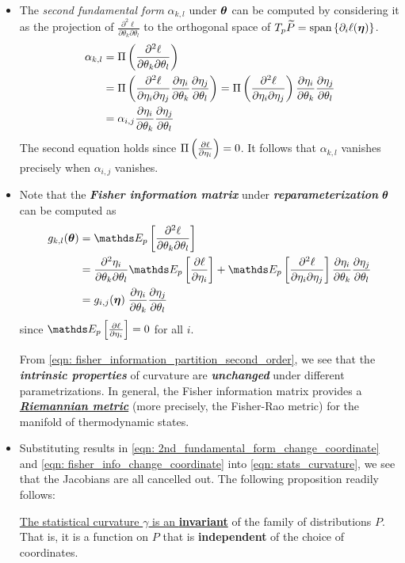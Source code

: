 \documentclass[11pt]{article}
\begin{document}
\begin{itemize}
\item The \emph{second fundamental form} $\alpha_{k,l}$ under  $\boldsymbol{\theta}$ can be computed by considering it as the projection of $\frac{\partial^2\ell}{\partial \theta_k \partial \theta_{l}}$ to the orthogonal space of $T_{p}\widetilde{P} = \text{span}\left\{\partial_i  \ell(\boldsymbol{\eta})\right\}$. 
\begin{align}
\alpha_{k,l} &= \Pi\left(\frac{\partial^2\ell}{\partial \theta_k \partial \theta_{l}} \right) \nonumber\\
&= \Pi\left( \frac{\partial^2\ell }{\partial \eta_{i} \partial \eta_{j}} \frac{\partial \eta_{i}}{ \partial \theta_k}\frac{\partial \eta_{j}}{ \partial \theta_l} \right)= \Pi\left( \frac{\partial^2\ell }{\partial \eta_{i} \partial \eta_{j}}\right) \frac{\partial \eta_{i}}{ \partial \theta_k}\frac{\partial \eta_{j}}{ \partial \theta_l} \nonumber\\
&= \alpha_{i,j} \frac{\partial \eta_{i}}{ \partial \theta_k}\frac{\partial \eta_{j}}{ \partial \theta_l}  \label{eqn: 2nd_fundamental_form_change_coordinate}
\end{align} The second equation holds since $ \Pi\left(\frac{\partial \ell}{ \partial \eta_{i}}\right) = 0$. It follows that $\alpha_{k,l}$ vanishes precisely when $\alpha_{i,j}$ vanishes.

\item Note that the \emph{\textbf{Fisher information matrix}} under \emph{\textbf{reparameterization}} $\boldsymbol{\theta}$ can be computed as
\begin{align}
g_{k,l}(\mb{\theta}) &=\E{p}{\frac{\partial^2\ell}{\partial \theta_k \partial \theta_{l}} } \nonumber\\
&= \frac{\partial^2\eta_i}{\partial \theta_k \partial \theta_{l}}\E{p}{ \partdiff{\ell}{\eta_{i}}}  + \E{p}{\frac{\partial^2\ell }{\partial \eta_{i} \partial \eta_{j}}} \partdiff{\eta_{i}}{\theta_k}\partdiff{\eta_{j}}{\theta_l} \nonumber\\
&= g_{i,j}(\mb{\eta})\; \partdiff{\eta_{i}}{\theta_k}\partdiff{\eta_{j}}{\theta_l} \label{eqn: fisher_info_change_coordinate}
\end{align} since $\E{p}{ \partdiff{\ell}{\eta_{i}}} = 0$ for all $i$.

From \eqref{eqn: fisher_information_partition_second_order}, we see that the \emph{\textbf{intrinsic properties}} of curvature are \emph{\textbf{unchanged}} under different parametrizations. In general, the Fisher information matrix provides a \underline{\emph{\textbf{Riemannian metric}}} (more precisely, the Fisher-Rao metric) for the manifold of thermodynamic states.


\item Substituting results in \eqref{eqn: 2nd_fundamental_form_change_coordinate} and \eqref{eqn: fisher_info_change_coordinate} into \eqref{eqn: stats_curvature}, we see that the Jacobians are all cancelled out. The following proposition readily follows:
\begin{proposition}
\underline{The statistical curvature $\gamma$ is an \textbf{invariant}} of the family of distributions $P$. That is, it is a function on $P$ that is \textbf{independent} of the choice of coordinates. 
\end{proposition}


\end{itemize}
\end{document}
